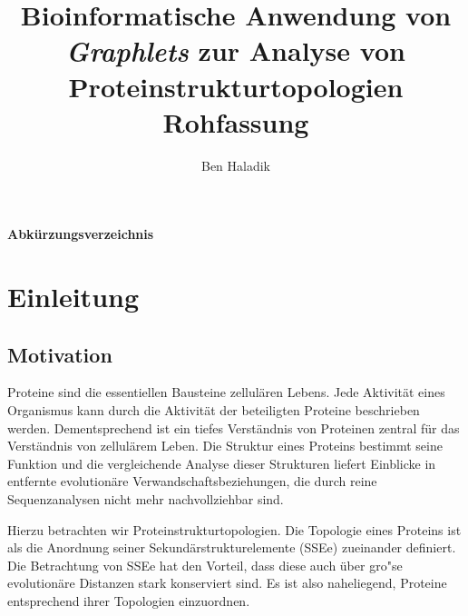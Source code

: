 \documentclass{report}
\author{Ben Haladik}
\title{Bioinformatische Anwendung von \textit{Graphlets} zur Analyse von Proteinstrukturtopologien \\ Rohfassung}
\begin{document}


\maketitle

\newpage

\tableofcontents

\newpage

\listoffigures

\newpage



\listoftables

\newpage

\bigskip
\begin{Huge}
\textbf{Abk\"urzungsverzeichnis}
\end{Huge}

\vspace{15mm}
\begin{acronym}
\end{acronym}


\newpage

\chapter{Einleitung}

\section{Motivation}


Proteine sind die essentiellen Bausteine zellul\"aren Lebens. Jede Aktivit\"at eines Organismus kann durch die Aktivit\"at der beteiligten Proteine beschrieben werden. Dementsprechend ist ein tiefes Verst\"andnis von Proteinen zentral f\"ur das Verst\"andnis von zellul\"arem Leben.
Die Struktur eines Proteins bestimmt seine Funktion und die vergleichende Analyse dieser Strukturen liefert Einblicke in entfernte evolution\"are Verwandschaftsbeziehungen, die durch reine Sequenzanalysen nicht mehr nachvollziehbar sind.

Hierzu betrachten wir Proteinstrukturtopologien. Die Topologie eines Proteins ist als die Anordnung seiner Sekund\"arstrukturelemente (SSEe)
 zueinander definiert. Die Betrachtung von SSEe hat den Vorteil, dass diese auch \"uber gro"se evolution\"are Distanzen stark konserviert sind. Es ist also naheliegend, Proteine entsprechend ihrer Topologien einzuordnen.
\end{document}
